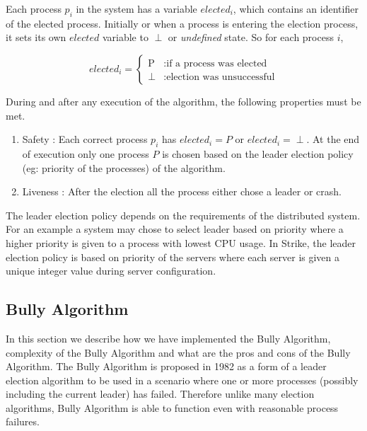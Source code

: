 \documentclass[dareport.tex]{subfiles}
\begin{document}
Each process $p_i$ in the system has a variable $elected_i$, which contains an identifier of the elected process. Initially or when a process is entering the election process, it sets its own $elected$ variable to $\perp$ or \emph{undefined} state. So for each process $i$,

\begin{equation*}
	elected_i =
		\begin{cases}
			\text{P} &: \text{if a process was elected}\\
			\text{$\perp$} &: \text{election was unsuccessful}
		\end{cases}
\end{equation*}

During and after any execution of the algorithm, the following properties must be met.
\begin{enumerate}
\item Safety : Each correct process $p_i$ has $elected_i = P$ or $elected_i = \perp$. At the end of execution only one process $P$ is chosen based on the leader election policy (eg: priority of the processes) of the algorithm.
\item Liveness : After the election all the process either chose a leader or crash.
\end{enumerate}

The leader election policy depends on the requirements of the distributed system. For an example a system may chose to select leader based on priority where a higher priority is given to a process with lowest CPU usage. In Strike, the leader election policy is based on priority of the servers where each server is given a unique integer value during server configuration.
\subsection{Bully Algorithm} \label{ssec:bully}
In this section we describe how we have implemented the Bully Algorithm, complexity of the Bully Algorithm and what are the pros and cons of the Bully Algorithm. The Bully Algorithm\cite{election} is proposed in 1982 as a form of a leader election algorithm to be used in a scenario where one or more processes (possibly including the current leader) has failed. Therefore unlike many election algorithms, Bully Algorithm is able to function even with reasonable process failures.
\end{document}
